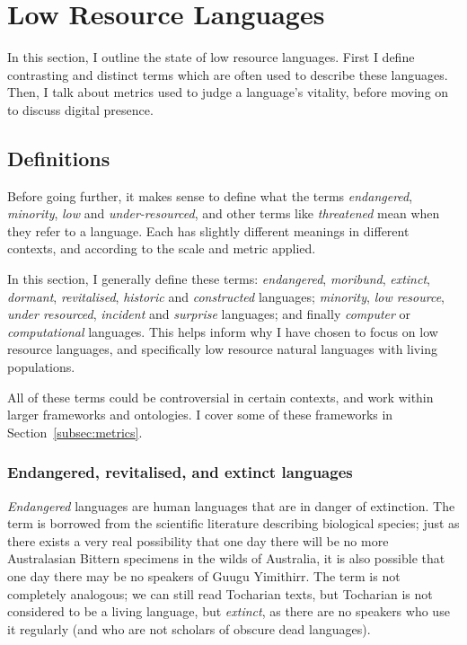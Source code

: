 \section{Low Resource Languages}
\label{sec:endlang}

In this section, I outline the state of low resource languages. First I define contrasting and distinct terms which are often used to describe these languages. Then, I talk about metrics used to judge a language's vitality, before moving on to discuss digital presence. 


\subsection{Definitions}

Before going further, it makes sense to define what the terms \emph{endangered}, \emph{minority}, \emph{low} and \emph{under-resourced}, and other terms like \emph{threatened} mean when they refer to a language. Each has slightly different meanings in different contexts, and according to the scale and metric applied.

In this section, I generally define these terms: \textit{endangered}, \textit{moribund}, \textit{extinct}, \textit{dormant}, \textit{revitalised}, \textit{historic} and \textit{constructed} languages; \textit{minority}, \textit{low resource}, \textit{under resourced}, \textit{incident} and \textit{surprise} languages; and finally \textit{computer} or \textit{computational} languages. This helps inform why I have chosen to focus on low resource languages, and specifically low resource natural languages with living populations.

All of these terms could be controversial in certain contexts, and work within larger frameworks and ontologies. I cover some of these frameworks in Section~\ref{subsec:metrics}.

\subsubsection{Endangered, revitalised, and extinct languages}

\emph{Endangered} languages are human languages that are in danger of extinction. The term is borrowed from the scientific literature describing biological species; just as there exists a very real possibility that one day there will be no more Australasian Bittern specimens in the wilds of Australia, it is also possible that one day there may be no speakers of Guugu Yimithirr. The term is not completely analogous; we can still read Tocharian texts, but Tocharian is not considered to be a living language, but \textit{extinct}, as there are no speakers who use it regularly (and who are not scholars of obscure dead languages).

